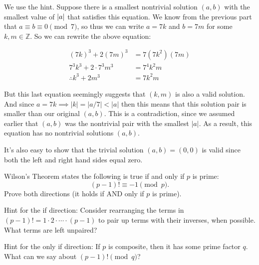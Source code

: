 \documentclass[11pt]{article}
\begin{document}
\begin{Parts}

\begin{solution}
  We use the hint. Suppose there is a smallest nontrivial solution $(a, b)$ with the smallest value of $\left\lvert a \right\rvert$ that satisfies this equation. We know from the previous part that $a \equiv b \equiv 0 \pmod 7$, so thus we can write $a = 7k$ and $b = 7m$ for some $k, m \in \mathbb Z$. So we can rewrite the above equation: 

  \begin{align*}
    (7k)^3 + 2(7m)^3 &= 7(7k^2)(7m)\\
    7^3 k^3 + 2 \cdot 7^3m^3 &= 7^4k^2m\\
    \therefore k^3 + 2m^3 &= 7k^2m
  \end{align*}

  But this last equation seemingly suggests that $(k, m)$ is also a valid solution. And since $a = 7k \implies |k| = |a/7| < |a|$ then this means that this solution pair is smaller than our original $(a, b)$. This is a contradiction, since we assumed earlier that $(a, b)$ was the nontrivial pair with the smallest $|a|$. As a result, this equation has no nontrivial solutions $(a, b)$. 

  It's also easy to show that the trivial solution $(a, b) = (0, 0)$ is valid since both the left and right hand sides equal zero.
\end{solution}

\end{Parts}
\pagebreak 
{}

Wilson's Theorem states the following is true if and only if $p$ is prime:
    \[(p - 1)! \equiv -1 \pmod{p}.\]
Prove both directions (it holds if AND only if $p$ is prime).

Hint for the if direction: Consider rearranging the terms in $(p - 1)! = 1 \cdot 2 \cdot \cdots \cdot (p - 1)$ to pair up terms with their inverses, when possible. What terms are left unpaired?

Hint for the only if direction: If $p$ is composite, then it has some prime factor $q$.  What can we say about $(p-1)! \pmod{q}$?
\end{document}
